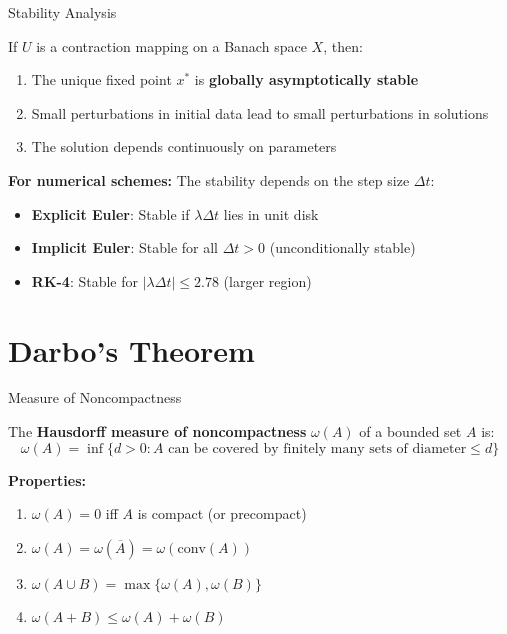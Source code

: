 \documentclass[aspectratio=169,10pt]{beamer}
\begin{document}
\begin{frame}{Stability Analysis}
\begin{theorem}
If $U$ is a contraction mapping on a Banach space $X$, then:
\begin{enumerate}
    \item The unique fixed point $x^*$ is \textbf{globally asymptotically stable}
    \item Small perturbations in initial data lead to small perturbations in solutions
    \item The solution depends continuously on parameters
\end{enumerate}
\end{theorem}

\vspace{1em}
\textbf{For numerical schemes:} The stability depends on the step size $\Delta t$:

\begin{itemize}
    \item \textbf{Explicit Euler}: Stable if $\lambda \Delta t$ lies in unit disk
    \item \textbf{Implicit Euler}: Stable for all $\Delta t > 0$ (unconditionally stable)
    \item \textbf{RK-4}: Stable for $|\lambda \Delta t| \leq 2.78$ (larger region)
\end{itemize}
\end{frame}

\section{Darbo's Theorem}

\begin{frame}{Measure of Noncompactness}
\begin{definition}
The \textbf{Hausdorff measure of noncompactness} $\omega(A)$ of a bounded set $A$ is:
\[
\omega(A) = \inf\{d > 0 : A \text{ can be covered by finitely many sets of diameter} \leq d\}
\]
\end{definition}

\vspace{1em}
\textbf{Properties:}
\begin{enumerate}
    \item $\omega(A) = 0$ iff $A$ is compact (or precompact)
    \item $\omega(A) = \omega(\overline{A}) = \omega(\text{conv}(A))$
    \item $\omega(A \cup B) = \max\{\omega(A), \omega(B)\}$
    \item $\omega(A + B) \leq \omega(A) + \omega(B)$
\end{enumerate}

\vspace{1em}
\end{frame}
\end{document}

